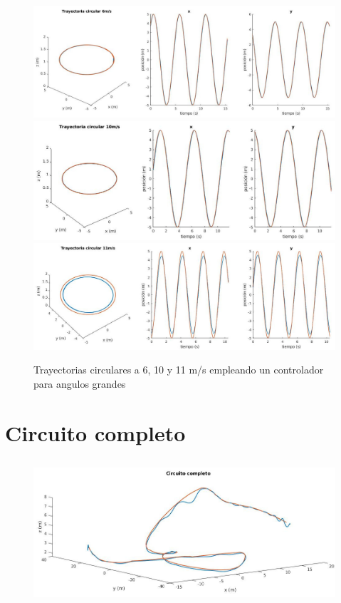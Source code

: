 \begin{figure}[htb!]
	\centering
	\includegraphics[width=\textwidth]{imagenes/fast_circle6ms}
	\includegraphics[width=\textwidth]{imagenes/fast_circle10ms}
	\includegraphics[width=\textwidth]{imagenes/fast_circle11ms}
	\caption{Trayectorias circulares a 6, 10 y 11 m/s empleando un controlador para angulos grandes}
	\label{circle:fast}
\end{figure}

\section{Circuito completo}
\subsection{}

\begin{figure}[htb!]
	\centering
	\includegraphics[width=\textwidth]{imagenes/circuitFigure}
	\caption{}
	\label{exp1:1}
\end{figure}


